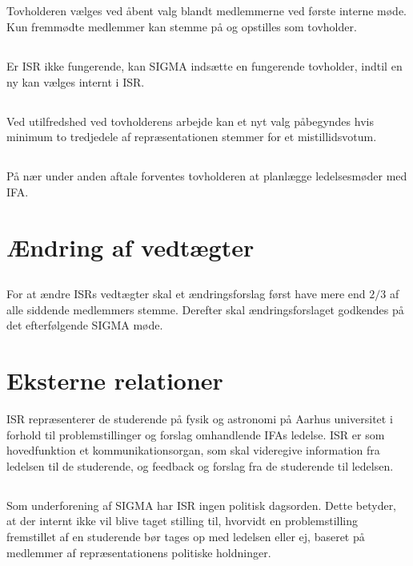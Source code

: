 \documentclass[danish,a4paper,twocolumn]{article}
\begin{document}
\subsection{}
Tovholderen vælges ved åbent valg blandt medlemmerne ved første interne
møde. Kun fremmødte medlemmer kan stemme på og opstilles som tovholder.
\subsection{}
Er ISR ikke fungerende, kan SIGMA indsætte en fungerende tovholder, indtil en ny kan vælges internt i ISR.
\subsection{}
Ved utilfredshed ved tovholderens arbejde kan et nyt valg påbegyndes hvis minimum to tredjedele af repræsentationen stemmer for et mistillidsvotum.
\subsection{}
På nær under anden aftale forventes tovholderen at planlægge ledelsesmøder
med IFA.
\section{Ændring af vedtægter}
\subsection{}
For at ændre ISRs vedtægter skal et ændringsforslag først have mere end $2/3$ af alle siddende medlemmers stemme. Derefter skal ændringsforslaget godkendes på det efterfølgende SIGMA møde. 

\section{ Eksterne relationer}
ISR repræsenterer de studerende på fysik og astronomi på Aarhus universitet i forhold til problemstillinger og forslag omhandlende IFAs ledelse. ISR er som hovedfunktion et kommunikationsorgan, som skal videregive information fra ledelsen til de studerende, og feedback og forslag fra de studerende til ledelsen.
\subsection{}
Som underforening af SIGMA har ISR ingen politisk dagsorden. Dette betyder, at der internt ikke vil blive taget stilling til, hvorvidt en problemstilling fremstillet af en studerende bør tages op med ledelsen eller ej, baseret på medlemmer af repræsentationens politiske holdninger. 
\end{document}
